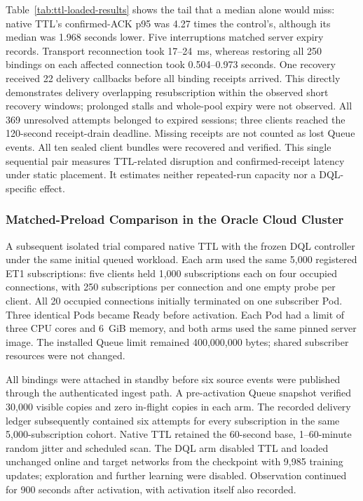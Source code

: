 Table~\ref{tab:ttl-loaded-results} shows the tail that a median alone would
miss: native TTL's confirmed-ACK p95 was 4.27 times the control's, although its
median was 1.968 seconds lower. Five interruptions matched server expiry records.
Transport reconnection took 17--24~ms, whereas restoring all 250 bindings on
each affected connection took 0.504--0.973 seconds. One recovery received
22 delivery callbacks before all binding receipts arrived. This directly
demonstrates delivery overlapping resubscription within the observed short
recovery windows; prolonged stalls and whole-pool expiry were not observed. All 369 unresolved
attempts belonged to expired sessions; three clients reached the 120-second
receipt-drain deadline. Missing receipts are not counted as lost Queue events.
All ten sealed client bundles were recovered and verified. This single
sequential pair measures TTL-related disruption and confirmed-receipt latency
under static placement. It estimates neither repeated-run capacity nor a
DQL-specific effect.

\subsubsection{Matched-Preload Comparison in the Oracle Cloud Cluster}
\label{sec:ttl-preload-results}

A subsequent isolated trial compared native TTL with the frozen DQL controller
under the same initial queued workload. Each arm used the same 5,000 registered
ET1 subscriptions: five clients held 1,000 subscriptions each on four occupied
connections, with 250 subscriptions per connection and one empty probe per
client. All 20 occupied connections initially terminated on one subscriber Pod.
Three identical Pods became Ready before activation. Each Pod had a limit of
three CPU cores and 6~GiB memory, and both arms used the same pinned server image.
The installed Queue limit remained 400,000,000 bytes; shared subscriber
resources were not changed.

All bindings were attached in standby before six source events were published
through the authenticated ingest path. A pre-activation Queue snapshot verified
30,000 visible copies and zero in-flight copies in each arm. The recorded
delivery ledger subsequently contained six attempts for every subscription in
the same 5,000-subscription cohort. Native TTL retained the 60-second base,
1--60-minute random jitter and scheduled scan. The DQL arm disabled TTL and
loaded unchanged online and target networks from the checkpoint with 9,985
training updates; exploration and further learning were disabled. Observation
continued for 900 seconds after activation, with activation itself also recorded.

